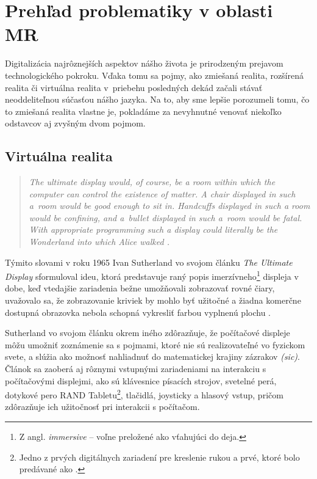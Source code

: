 \section{Prehľad problematiky v oblasti MR}
Digitalizácia najrôznejších aspektov nášho života je prirodzeným prejavom technologického pokroku. Vďaka tomu sa 
pojmy, ako zmiešaná realita, rozšírená realita či virtuálna realita v~priebehu posledných dekád začali stávať neoddeliteľnou súčasťou nášho jazyka. 
Na to, aby sme lepšie porozumeli tomu, čo to zmiešaná realita vlastne je, pokladáme za nevyhnutné venovať niekoľko odstavcov aj zvyšným dvom pojmom.

\subsection{Virtuálna realita}
\begin{quote}\itshape
  The ultimate display would, of course, be a room within which the computer can control the existence of matter. A chair displayed in such a~room 
  would be good enough to sit in. Handcuffs displayed in such a room would be confining, and a~bullet displayed in such a~room would be fatal. 
  With appropriate programming such a display could literally be the Wonderland into which Alice walked \cite{sutherlandUltimateDisplay1965b}.
\end{quote}
Týmito slovami v roku 1965 Ivan Sutherland vo svojom článku \emph{The Ultimate Display} sformuloval ideu, ktorá predstavuje raný popis 
imerzívneho\footnote{Z angl. \emph{immersive} {--} voľne preložené ako vťahujúci do deja.} displeja v dobe, keď vtedajšie zariadenia bežne umožňovali 
zobrazovať rovné čiary, uvažovalo sa, že zobrazovanie kriviek by mohlo byť užitočné a žiadna komerčne dostupná obrazovka nebola schopná vykresliť farbou 
vyplnenú plochu \cite{sutherlandUltimateDisplay1965b}. 

Sutherland vo svojom článku okrem iného zdôrazňuje, že počítačové displeje môžu umožniť zoznámenie sa s pojmami, ktoré nie sú realizovateľné vo fyzickom svete, 
a slúžia ako možnosť nahliadnuť do matematickej krajiny zázrakov \emph{(sic)}. Článok sa zaoberá aj rôznymi vstupnými zariadeniami na interakciu s počítačovými 
displejmi, ako sú klávesnice písacích strojov, svetelné perá, dotykové pero RAND Tabletu\footnote{Jedno z prvých digitálnych zariadení pre kreslenie rukou a prvé, 
ktoré bolo predávané ako .}, tlačidlá, joysticky a hlasový vstup, pričom zdôrazňuje ich užitočnosť pri interakcii s počítačom. 


